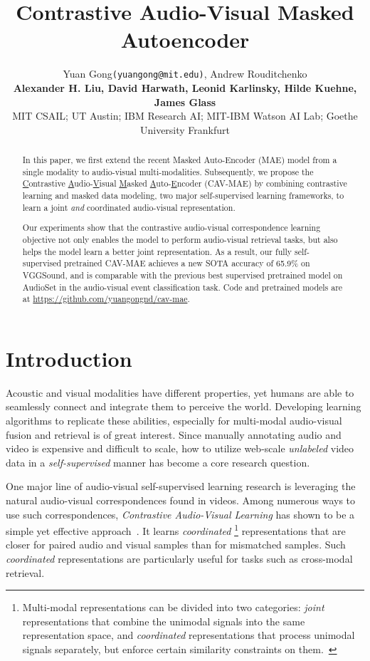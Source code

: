 \documentclass{article} \usepackage{iclr2023_conference,times}
\title{Contrastive Audio-Visual Masked \\ Autoencoder}
\author{Yuan Gong\textmd{\texttt{\small{(yuangong@mit.edu)}}}, Andrew Rouditchenko \\
\textbf{Alexander H. Liu, David Harwath, Leonid Karlinsky, Hilde Kuehne, James Glass}\\
\small{MIT CSAIL; UT Austin; IBM Research AI; MIT-IBM Watson AI Lab; Goethe University Frankfurt}}
\begin{document}
\maketitle

\begin{abstract}

In this paper, we first extend the recent Masked Auto-Encoder (MAE) model from a single modality to audio-visual multi-modalities. Subsequently, we propose the \underline{C}ontrastive \underline{A}udio-\underline{V}isual \underline{M}asked \underline{A}uto-\underline{E}ncoder (CAV-MAE) by combining contrastive learning and masked data modeling, two major self-supervised learning frameworks, to learn a joint \emph{and} coordinated audio-visual representation.

Our experiments show that the contrastive audio-visual correspondence learning objective not only enables the model to perform audio-visual retrieval tasks, but also helps the model learn a better joint representation. As a result, our fully self-supervised pretrained CAV-MAE achieves a new SOTA accuracy of 65.9\% on VGGSound, and is comparable with the previous best supervised pretrained model on AudioSet in the audio-visual event classification task. Code and pretrained models are at \url{https://github.com/yuangongnd/cav-mae}.

\end{abstract}

\section{Introduction}

Acoustic and visual modalities have different properties, yet humans are able to seamlessly connect and integrate them to perceive the world. Developing learning algorithms to replicate these abilities, especially for multi-modal audio-visual fusion and retrieval is of great interest. Since manually annotating audio and video is expensive and difficult to scale, how to utilize web-scale \emph{unlabeled} video data in a \emph{self-supervised} manner has become a core research question.

One major line of audio-visual self-supervised learning research is leveraging the natural audio-visual correspondences found in videos.
Among numerous ways to use such correspondences, \emph{Contrastive Audio-Visual Learning} has shown to be a simple yet effective approach~\citep{arandjelovic2018objects,morgado2021audio,rouditchenko2021avlnet}. It learns \emph{coordinated}
\footnote{Multi-modal representations can be divided into two categories: \emph{joint} representations that combine the unimodal signals into the same representation space, and \emph{coordinated} representations that process unimodal signals separately, but enforce certain similarity constraints on them.~\citep{baltruvsaitis2018multimodal}} representations that are closer for paired audio and visual samples than for mismatched samples. Such \emph{coordinated} representations are particularly useful for tasks such as cross-modal retrieval.
\end{document}
